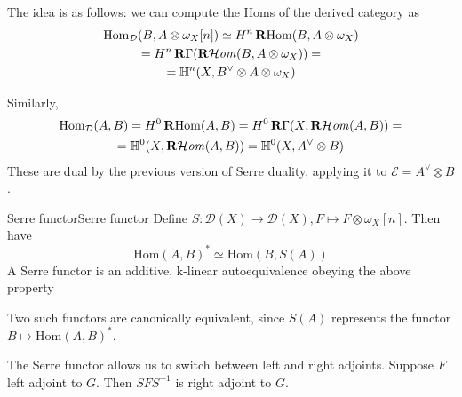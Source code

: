 The idea is as follows: we can compute the Homs of the derived category as 
$$\begin{gathered}
    \mathrm{Hom}_{\mathcal{D}}(B,A\otimes \omega_{X}[n])\simeq H^n\operatorname{\mathbf{R}Hom}(B,A\otimes \omega_{X})\\=H^n \operatorname{\mathbf{R}\Gamma} ( \operatorname{\mathbf{R}\mathcal{H}\mathit{om}}(B,A\otimes \omega_{X}))=\\=\mathbb{H}^n(X,B^\lor \otimes A \otimes \omega_{X})
\end{gathered}$$

Similarly, $$\begin{gathered}
\mathrm{Hom}_{\mathcal{D}}(A,B)=H^0\operatorname{\mathbf{R}Hom}(A,B)=H^0 \operatorname{\mathbf{R}\Gamma}(X,\operatorname{\mathbf{R}\mathcal{H}\mathit{om}}(A,B))=\\=\mathbb{H}^0(X,\operatorname{\mathbf{R}\mathcal{H}\mathit{om}}(A,B))=\mathbb{H}^0(X, A^\lor\otimes B)
\end{gathered}$$
These are dual by the previous version of Serre duality, applying it to $\mathcal{E}=A^\lor \otimes B$. 

\begin{definition}{Serre functor}{Serre functor}
    Define $S:\mathcal{D}(X)\rightarrow \mathcal{D}(X), F\mapsto F\otimes \omega_{X}[n]$. Then have $$\mathrm{Hom}(A,B)^*\simeq \mathrm{Hom}(B,S(A))$$
     A Serre functor is an additive, k-linear autoequivalence obeying the above property
\end{definition}

Two such functors are canonically equivalent, since $S(A)$ represents the functor $B\mapsto \mathrm{Hom}(A,B)^*$. 




The Serre functor allows us to switch between left and right adjoints. Suppose $F$ left adjoint to $G$. Then $SFS^{-1}$ is right adjoint to $G$. 

